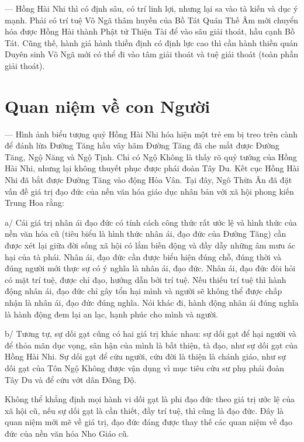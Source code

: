 — Hồng Hài Nhi thì có định sâu, có trí linh lợi, nhưng lại sa vào tà kiến và dục ý mạnh. Phải có trí tuệ Vô Ngã thâm huyền của Bồ Tát Quán Thế Âm mới chuyển hóa được Hồng Hài thành Phật tử Thiện Tài để vào sâu giải thoát, hầu cạnh Bồ Tát. Cũng thế, hành giả hành thiền định có định lực cao thì cần hành thiền quán Duyên sinh Vô Ngã mới có thể đi vào tâm giải thoát và tuệ giải thoát (toàn phần giải thoát).

\section{Quan niệm về con Người} %
\label{sec:40_41_con_nguoi}

— Hình ảnh biểu tượng quỷ Hồng Hài Nhi hóa hiện một trẻ em bị treo trên cành để đánh lừa Đường Tăng hầu vây hãm Đường Tăng đã che mắt được Đường Tăng, Ngộ Năng và Ngộ Tịnh. Chỉ có Ngộ Không là thấy rõ quỷ tướng của Hồng Hài Nhi, nhưng lại không thuyết phục được phái đoàn Tây Du. Kết cục Hồng Hài Nhi đã bắt được Đường Tăng vào động Hỏa Vân. Tại đây, Ngô Thừa Ân đã đặt vấn đề giá trị đạo đức của nền văn hóa giáo dục nhân bản với xã hội phong kiến Trung Hoa rằng:

a/ Cái giá trị nhân ái đạo đức có tính cách công thức rất ước lệ và hình thức của nền văn hóa cũ (tiêu biểu là hình thức nhân ái, đạo đức của Đường Tăng) cần được xét lại giữa đời sống xã hội có lắm biến động và đầy dẫy những âm mưu ác hại của tà phái. Nhân ái, đạo đức cần được biểu hiện đúng chỗ, đúng thời và đúng người mới thực sự có ý nghĩa là nhân ái, đạo đức. Nhân ái, đạo đức đòi hỏi có mặt trí tuệ, được chỉ đạo, hướng dẫn bởi trí tuệ. Nếu thiếu trí tuệ thì hành động nhân ái, đạo đức chỉ gây tổn hại mình và người sẽ không thể được chấp nhận là nhân ái, đạo đức đúng nghĩa. Nói khác đi, hành động nhân ái đúng nghĩa là hành động đem lại an lạc, hạnh phúc cho mình và người.

b/ Tương tự, sự dối gạt cũng có hai giá trị khác nhau: sự dối gạt để hại người và để thỏa mãn dục vọng, sân hận của mình là bất thiện, tà đạo, như sự dối gạt của Hồng Hài Nhi. Sự dối gạt để cứu người, cứu đời là thiện là chánh giáo, như sự dối gạt của Tôn Ngộ Không được vận dụng vì mục tiêu cứu sư phụ phái đoàn Tây Du và để cứu vớt dân Đông Độ.

Không thể khẳng định mọi hành vi dối gạt là phi đạo đức theo giá trị ước lệ của xã hội cũ, nếu sự dối gạt là cần thiết, đầy trí tuệ, thì cũng là đạo đức. Đây là quan niệm mới mẽ về giá trị, đạo đức đáng được thay thế các quan niệm về đạo đức của nền văn hóa Nho Giáo cũ.

